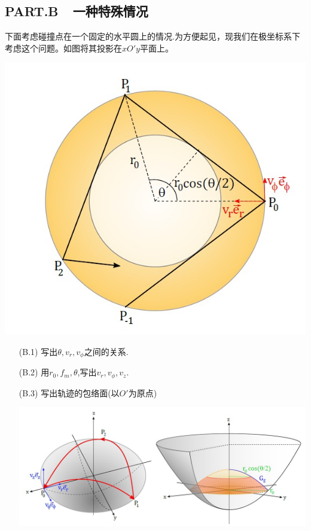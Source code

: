 \documentclass{article}
\begin{document}
\subsection*{PART.B\ \ 一种特殊情况}
下面考虑碰撞点在一个固定的水平圆上的情况.为方便起见，现我们在极坐标系下考虑这个问题。如图将其投影在$xO'y$平面上。\par
    \begin{center}
\includegraphics[scale=0.3]{img/0017.2.jpg}\par    
    \end{center}

\begin{itemize}
    \item[(B.1)]写出$\theta,v_r,v_{\phi}$之间的关系.
    \item[(B.2)]用$r_0,f_m,\theta$,写出$v_r,v_{\phi},v_z$.
    \item[(B.3)]写出轨迹的包络面(以$O'$为原点)  
    \begin{center}
    \includegraphics[scale=0.4]{img/0017.3.jpg}\par
    \end{center}

\end{itemize}
\end{document}
